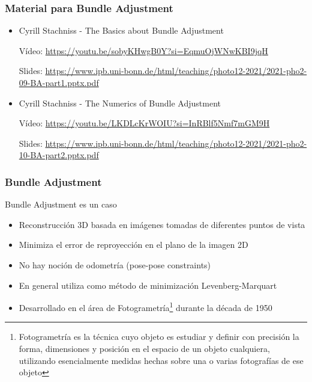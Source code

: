 \begin{frame}
    \frametitle{Material para Bundle Adjustment}
    
    
    \begin{itemize}
        \item Cyrill Stachniss - The Basics about Bundle Adjustment
        
        Vídeo: \url{https://youtu.be/sobyKHwgB0Y?si=EqmuOjWNwKBI9jqH}
        
        Slides: \url{https://www.ipb.uni-bonn.de/html/teaching/photo12-2021/2021-pho2-09-BA-part1.pptx.pdf}
        \item Cyrill Stachniss - The Numerics of Bundle Adjustment
        
        Vídeo: \url{https://youtu.be/LKDLcKrWOIU?si=InRBlf5Nmf7mGM9H}
        
        Slides: \url{https://www.ipb.uni-bonn.de/html/teaching/photo12-2021/2021-pho2-10-BA-part2.pptx.pdf}
    \end{itemize}
\end{frame}

\begin{frame}
    \frametitle{Bundle Adjustment}
    
    Bundle Adjustment es un caso
    
    \begin{itemize}
        \item Reconstrucción 3D basada en imágenes tomadas de diferentes puntos de vista
        \item Minimiza el error de reproyección en el plano de la imagen 2D
        \item No hay noción de odometría (pose-pose constraints)
        \item En general utiliza como método de minimización Levenberg-Marquart
        \item Desarrollado en el área de Fotogrametría\footnote{Fotogrametría es la técnica cuyo objeto es estudiar y definir con precisión la forma, dimensiones y posición en el espacio de un objeto cualquiera, utilizando esencialmente medidas hechas sobre una o varias fotografías de ese objeto} durante la década de 1950
    \end{itemize}
    
\end{frame}

